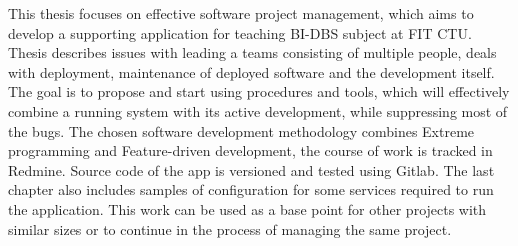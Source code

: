 This thesis focuses on effective software project management, which aims to develop a supporting application for teaching BI-DBS subject at FIT CTU. Thesis describes issues with leading a teams consisting of multiple people, deals with deployment, maintenance of deployed software and the development itself. The goal is to propose and start using procedures and tools, which will effectively combine a running system with its active development, while suppressing most of the bugs. The chosen software development methodology combines Extreme programming and Feature-driven development, the course of work is tracked in Redmine. Source code of the app is versioned and tested using Gitlab. The last chapter also includes samples of configuration for some services required to run the application. This work can be used as a base point for other projects with similar sizes or to continue in the process of managing the same project.